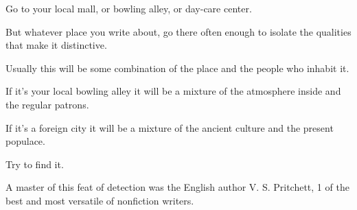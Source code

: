 \documentclass{book}
\numberwithin{equation}{section}
\begin{document}
Go to your local mall, or bowling alley, or day-care center.

But whatever place you write about, go there often enough to isolate the qualities that make it distinctive.

Usually this will be some combination of the place and the people who inhabit it.

If it's your local bowling alley it will be a mixture of the atmosphere inside and the regular patrons.

If it's a foreign city it will be a mixture of the ancient culture and the present populace.

Try to find it.

A master of this feat of detection was the English author V. S. Pritchett, 1 of the best and most versatile of nonfiction writers.
\end{document}
